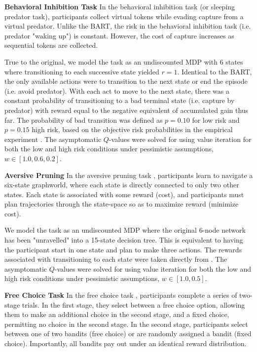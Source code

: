\documentclass[11pt]{article} %
\begin{document}
\textbf{Behavioral Inhibition Task} In the behavioral inhibition task \citep{bach2015} (or sleeping predator task), participants collect virtual tokens while evading capture from a virtual predator. Unlike the BART, the risk in the behavioral inhibition task (i.e. predator "waking up") is constant. However, the cost of capture increases as sequential tokens are collected.

True to the original, we model the task as an undiscounted MDP with 6 states where transitioning to each successive state yielded $r=1$. Identical to the BART, the only available actions were to transition to the next state or end the episode (i.e. avoid predator). With each act to move to the next state, there was a constant probability of transitioning to a bad terminal state (i.e. capture by predator) with reward equal to the negative equivalent of accumulated gain thus far. The probability of bad transition was defined as $p = 0.10$ for low risk and $p = 0.15$ high risk, based on the objective risk probabilities in the empirical experiment \citep{bach2015}. The asymptomatic $Q$-values were solved for using value iteration for both the low and high risk conditions under pessimistic assumptions, $w \in [1.0, 0.6, 0.2]$.

\textbf{Aversive Pruning} In the aversive pruning task \citep{Huys2012, Lally2017}, participants learn to navigate a six-state graphworld, where each state is directly connected to only two other states. Each state is associated with some reward (cost), and participants must plan trajectories through the state-space so as to maximize reward (minimize cost). 

We model the task as an undiscounted MDP where the original 6-node network has been "unravelled" into a 15-state decision tree. This is equivalent to having the participant start in one state and plan to make three actions. The rewards associated with transitioning to each state were taken directly from \citep{Huys2012, Lally2017}. The asymptomatic $Q$-values were solved for using value iteration for both the low and high risk conditions under pessimistic assumptions, $w \in [1.0, 0.5]$.

\textbf{Free Choice Task} In the free choice task \citep{Leotti2011}, participants complete a series of two-stage trials. In the first stage, they select between a free choice option, allowing them to make an additional choice in the second stage, and a fixed choice, permitting no choice in the second stage. In the second stage, participants select between one of two bandits (free choice) or are randomly assigned a bandit (fixed choice). Importantly, all bandits pay out under an identical reward distribution. 
\end{document}

